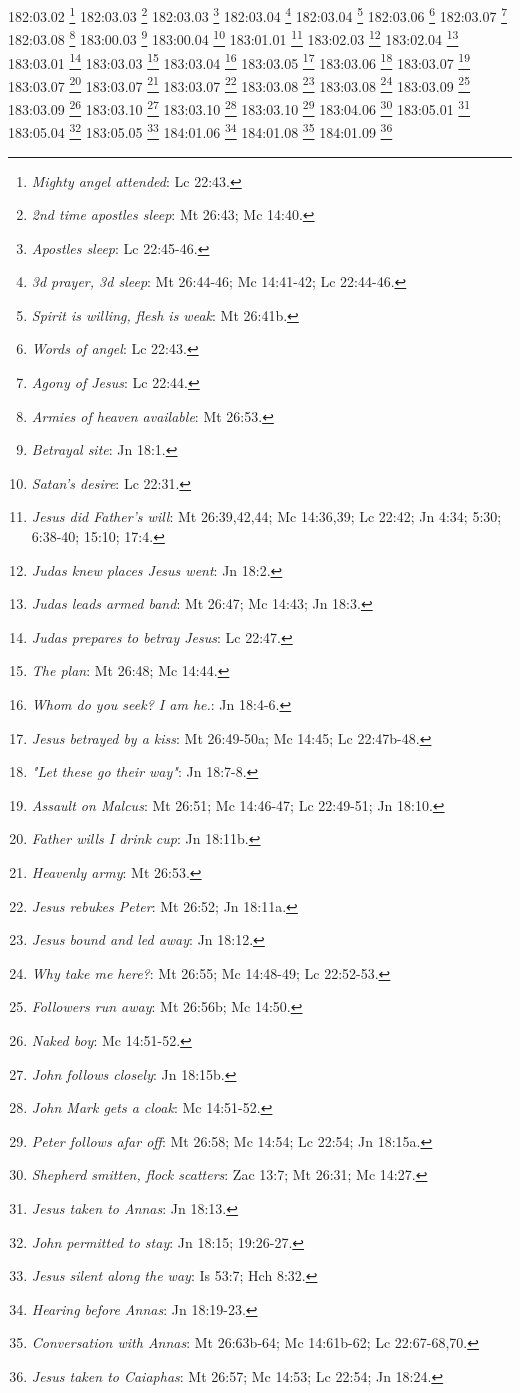 182:03.02 \footnote{\textit{Mighty angel attended}: Lc 22:43.}
182:03.03 \footnote{\textit{2nd time apostles sleep}: Mt 26:43; Mc 14:40.}
182:03.03 \footnote{\textit{Apostles sleep}: Lc 22:45-46.}
182:03.04 \footnote{\textit{3d prayer, 3d sleep}: Mt 26:44-46; Mc 14:41-42; Lc 22:44-46.}
182:03.04 \footnote{\textit{Spirit is willing, flesh is weak}: Mt 26:41b.}
182:03.06 \footnote{\textit{Words of angel}: Lc 22:43.}
182:03.07 \footnote{\textit{Agony of Jesus}: Lc 22:44.}
182:03.08 \footnote{\textit{Armies of heaven available}: Mt 26:53.}
183:00.03 \footnote{\textit{Betrayal site}: Jn 18:1.}
183:00.04 \footnote{\textit{Satan's desire}: Lc 22:31.}
183:01.01 \footnote{\textit{Jesus did Father's will}: Mt 26:39,42,44; Mc 14:36,39; Lc 22:42; Jn 4:34; 5:30; 6:38-40; 15:10; 17:4.}
183:02.03 \footnote{\textit{Judas knew places Jesus went}: Jn 18:2.}
183:02.04 \footnote{\textit{Judas leads armed band}: Mt 26:47; Mc 14:43; Jn 18:3.}
183:03.01 \footnote{\textit{Judas prepares to betray Jesus}: Lc 22:47.}
183:03.03 \footnote{\textit{The plan}: Mt 26:48; Mc 14:44.}
183:03.04 \footnote{\textit{Whom do you seek? I am he.}: Jn 18:4-6.}
183:03.05 \footnote{\textit{Jesus betrayed by a kiss}: Mt 26:49-50a; Mc 14:45; Lc 22:47b-48.}
183:03.06 \footnote{\textit{"Let these go their way"}: Jn 18:7-8.}
183:03.07 \footnote{\textit{Assault on Malcus}: Mt 26:51; Mc 14:46-47; Lc 22:49-51; Jn 18:10.}
183:03.07 \footnote{\textit{Father wills I drink cup}: Jn 18:11b.}
183:03.07 \footnote{\textit{Heavenly army}: Mt 26:53.}
183:03.07 \footnote{\textit{Jesus rebukes Peter}: Mt 26:52; Jn 18:11a.}
183:03.08 \footnote{\textit{Jesus bound and led away}: Jn 18:12.}
183:03.08 \footnote{\textit{Why take me here?}: Mt 26:55; Mc 14:48-49; Lc 22:52-53.}
183:03.09 \footnote{\textit{Followers run away}: Mt 26:56b; Mc 14:50.}
183:03.09 \footnote{\textit{Naked boy}: Mc 14:51-52.}
183:03.10 \footnote{\textit{John follows closely}: Jn 18:15b.}
183:03.10 \footnote{\textit{John Mark gets a cloak}: Mc 14:51-52.}
183:03.10 \footnote{\textit{Peter follows afar off}: Mt 26:58; Mc 14:54; Lc 22:54; Jn 18:15a.}
183:04.06 \footnote{\textit{Shepherd smitten, flock scatters}: Zac 13:7; Mt 26:31; Mc 14:27.}
183:05.01 \footnote{\textit{Jesus taken to Annas}: Jn 18:13.}
183:05.04 \footnote{\textit{John permitted to stay}: Jn 18:15; 19:26-27.}
183:05.05 \footnote{\textit{Jesus silent along the way}: Is 53:7; Hch 8:32.}
184:01.06 \footnote{\textit{Hearing before Annas}: Jn 18:19-23.}
184:01.08 \footnote{\textit{Conversation with Annas}: Mt 26:63b-64; Mc 14:61b-62; Lc 22:67-68,70.}
184:01.09 \footnote{\textit{Jesus taken to Caiaphas}: Mt 26:57; Mc 14:53; Lc 22:54; Jn 18:24.}
